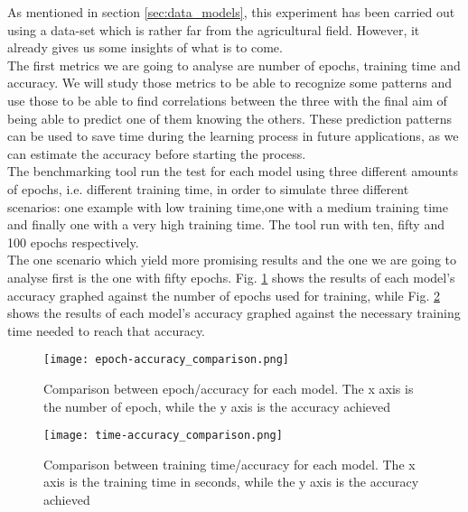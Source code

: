As mentioned in section \ref{sec:data_models}, this experiment has been carried out using a data-set which is rather far from the agricultural field. However, it already gives us some insights of what is to come. \\
The first metrics we are going to analyse are number of epochs, training time and accuracy. We will study those metrics to be able to recognize some patterns and use those to be able to find correlations between the three with the final aim of being able to predict one of them knowing the others. These prediction patterns can be used to save time during the learning process in future applications, as we can estimate the accuracy before starting the process.  \\
The benchmarking tool run the test for each model using three different amounts of epochs, i.e. different training time, in order to simulate three different scenarios: one example with low training time,one with a medium training time and finally one with a very high training time. The tool run with ten, fifty and 100 epochs respectively. \\
The one scenario which yield more promising results and the one we are going to analyse first is the one with fifty epochs. Fig. \ref{fig:com_ep_ac_models} shows the results of each model's accuracy graphed against the number of epochs used for training, while  Fig. \ref{fig:com_ti_ac_models} shows the results of each model's accuracy graphed against the necessary training time needed to reach that accuracy.\\




\begin{figure}[h]
       \centering 
	    \texttt{[image: epoch-accuracy\_comparison.png]}
        \caption[Comparison between epoch/accuracy for each model]{Comparison between epoch/accuracy for each model. The x axis is the number of epoch, while the y axis is the accuracy achieved}
         \label{fig:com_ep_ac_models}
     \end{figure}
\begin{figure}[h]
\centering 
	    \texttt{[image: time-accuracy\_comparison.png]}
        \caption[Comparison between training time/accuracy for each model]{Comparison between training time/accuracy for each model. The x axis is the training time in seconds, while the y axis is the accuracy achieved}
        \label{fig:com_ti_ac_models}
\end{figure}



